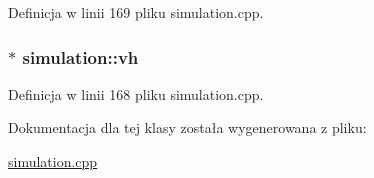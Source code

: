 Definicja w linii 169 pliku simulation.\-cpp.

\hypertarget{classsimulation_ae6da1f15728f49be7b0793700866ede9}{
\subsubsection[{vh}]{$\ast$ simulation\-::vh\hspace{0.3cm}{\ttfamily [private]}}}\label{classsimulation_ae6da1f15728f49be7b0793700866ede9}


Definicja w linii 168 pliku simulation.\-cpp.



Dokumentacja dla tej klasy została wygenerowana z pliku\-:\begin{DoxyCompactItemize}
\item 
\hyperlink{simulation_8cpp}{simulation.\-cpp}\end{DoxyCompactItemize}
